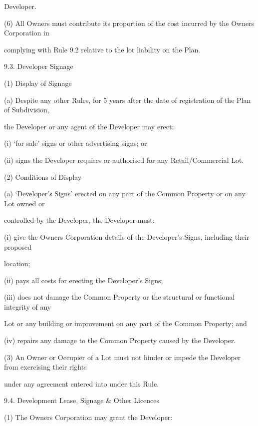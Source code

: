 \documentclass{article}
\begin{document}
{\fontsize{10.02}{1}Developer. }

{\fontsize{9.962}{1}(6) All Owners must contribute its proportion of the cost incurred by the Owners Corporation in }

{\fontsize{10.02}{1}complying with Rule 9.2 relative to the lot liability on the Plan. }

{\fontsize{9.99}{1}9.3. Developer Signage }

{\fontsize{9.962}{1}(1) Display of Signage }

{\fontsize{9.962}{1}(a) Despite any other Rules, for 5 years after the date of registration of the Plan of Subdivision, }

{\fontsize{10.02}{1}the Developer or any agent of the Developer may erect: }

{\fontsize{9.962}{1}(i) ‘for sale’ signs or other advertising signs; or }

{\fontsize{9.962}{1}(ii) signs the Developer requires or authorised for any Retail/Commercial Lot. }

{\fontsize{9.962}{1}(2) Conditions of Display }

{\fontsize{9.962}{1}(a) ‘Developer’s Signs’ erected on any part of the Common Property or on any Lot owned or }

{\fontsize{10.02}{1}controlled by the Developer, the Developer must: }

{\fontsize{9.962}{1}(i) give the Owners Corporation details of the Developer’s Signs, including their proposed }

{\fontsize{10.02}{1}location; }

{\fontsize{9.962}{1}(ii) pays all costs for erecting the Developer’s Signs; }

{\fontsize{9.962}{1}(iii) does not damage the Common Property or the structural or functional integrity of any }

{\fontsize{10.02}{1}Lot or any building or improvement on any part of the Common Property; and }

{\fontsize{9.962}{1}(iv) repairs any damage to the Common Property caused by the Developer. }

{\fontsize{9.962}{1}(3) An Owner or Occupier of a Lot must not hinder or impede the Developer from exercising their rights }

{\fontsize{10.02}{1}under any agreement entered into under this Rule. }

{\fontsize{9.99}{1}9.4. Development Lease, Signage \& Other Licences }

{\fontsize{9.962}{1}(1) The Owners Corporation may grant the Developer: }
\end{document}
